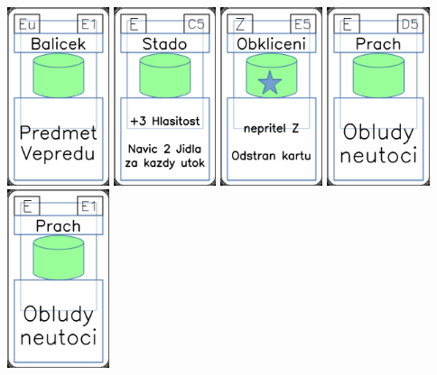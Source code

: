 \documentclass[a4paper]{article}
\begin{document}
	\includegraphics[width=3.0cm]{img-4_20}
	\includegraphics[width=3.0cm]{img-4_44}
	\includegraphics[width=3.0cm]{img-5_54}
	\includegraphics[width=3.0cm]{img-4_49}
	\includegraphics[width=3.0cm]{img-4_50}
\end{document}

